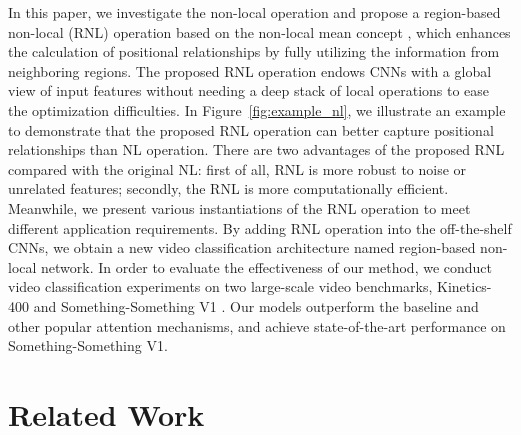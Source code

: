 \documentclass[a4paper,conference]{IEEEtran}
\begin{document}
In this paper, we investigate the non-local operation \cite{wang2018non} and propose a region-based non-local (RNL) operation based on the non-local mean concept \cite{buades2005non}, which enhances the calculation of positional relationships by fully utilizing the information from neighboring regions. The proposed RNL operation endows CNNs with a global view of input features without needing a deep stack of local operations to ease the optimization difficulties. In Figure~\ref{fig:example_nl}, we illustrate an example to demonstrate that the proposed RNL operation can better capture positional relationships than NL operation.
 There are two advantages of the proposed RNL compared with the original NL: first of all, RNL is more robust to noise or unrelated features; secondly, the RNL is more computationally efficient. Meanwhile, we present various instantiations of the RNL operation to meet different application requirements. By adding RNL operation into the off-the-shelf CNNs, we obtain a new video classification architecture named region-based non-local network. In order to evaluate the effectiveness of our method, we conduct video classification experiments on two large-scale video benchmarks, Kinetics-400 \cite{carreira2017quo} and Something-Something V1 \cite{goyal2017something}. Our models outperform the baseline and other popular attention mechanisms, and achieve state-of-the-art performance on Something-Something V1.
\section{Related Work}
\label{Sec2}
\end{document}
